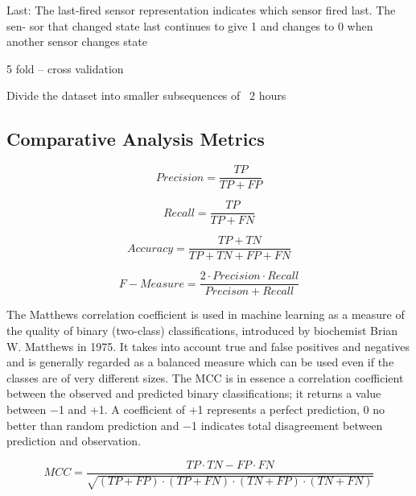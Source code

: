 \documentclass[11pt, oneside]{article}   	%
\begin{document}
Last: The last-fired sensor representation indicates which sensor fired last. The sen- sor that changed state last continues to give 1 and changes to 0 when another sensor changes state 

5 fold – cross validation

Divide the dataset into smaller subsequences of ~2 hours 


\subsection{Comparative Analysis Metrics}

\begin{equation}
Precision = \frac{TP}{TP+FP}
\end{equation}

\begin{equation}
Recall = \frac{TP}{TP+FN}
\end{equation}

\begin{equation}
Accuracy = \frac{TP+TN}{TP+TN+FP+FN}
\end{equation}

\begin{equation}
F-Measure = \frac{2\cdot Precision\cdot Recall}{Precison+Recall}
\end{equation}

The Matthews correlation coefficient is used in machine learning as a measure of the quality of binary (two-class) classifications, introduced by biochemist Brian W. Matthews in 1975. It takes into account true and false positives and negatives and is generally regarded as a balanced measure which can be used even if the classes are of very different sizes. The MCC is in essence a correlation coefficient between the observed and predicted binary classifications; it returns a value between −1 and +1. A coefficient of +1 represents a perfect prediction, 0 no better than random prediction and −1 indicates total disagreement between prediction and observation.

\begin{equation}
MCC=\frac{TP\cdot TN-FP\cdot FN}{\sqrt{(TP+FP)\cdot (TP+FN)\cdot (TN+FP)\cdot (TN+FN)}}
\end{equation}
\end{document}
